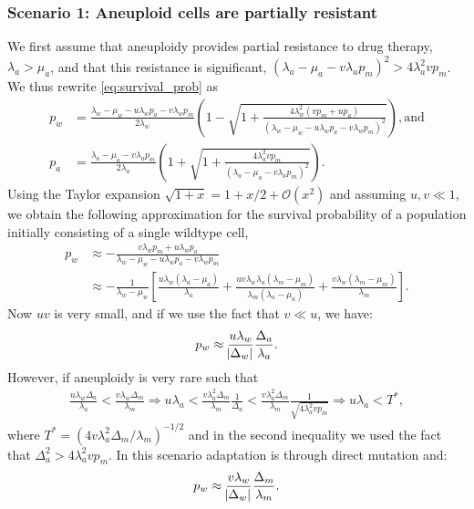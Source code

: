 \documentclass[12pt]{extarticle}
\begin{document}
\begin{appendices}
\subsubsection*{Scenario 1: Aneuploid cells are partially resistant} 

We first assume that aneuploidy provides partial resistance to drug therapy, $\lambda_a>\mu_a$, and that this resistance is significant, $\left(\lambda_a-\mu_a-v\lambda_ap_m\right)^2 > 4\lambda_a^2 v p_m$.
We thus rewrite \cref{eq:survival_prob} as
\begin{align*}
p_w&=\frac{\lambda_w-\mu_w-u\lambda_wp_a-v\lambda_wp_m}{2\lambda_w}\left(1-\sqrt{1+\frac{4\lambda_w^2\left(vp_m+up_a\right)}{\left(\lambda_w-\mu_w-u\lambda_wp_a-v\lambda_wp_m\right)^2}}\right) ,
\text{and} \\
p_a&=\frac{\lambda_a-\mu_a-v\lambda_ap_m}{2\lambda_a}\left(1+\sqrt{1+\frac{4\lambda_a^2vp_m}{\left(\lambda_a-\mu_a-v\lambda_ap_m\right)^2}}\right) . 
\end{align*}
Using the Taylor expansion $\sqrt{1+x}=1+x/2+\mathcal{O}(x^2)$ and assuming $u,v \ll 1$,
we obtain the following approximation for the survival probability of a population initially consisting of a single wildtype cell,
\begin{align} \label{eq:survprobwapprox1}
p_w 
&\approx -\frac{v\lambda_wp_m+u\lambda_wp_a}{\lambda_w-\mu_w-u\lambda_wp_a-v\lambda_wp_m}\\
\nonumber
&\approx-\frac{1}{\lambda_w-\mu_w}\left[\frac{u\lambda_w\left(\lambda_a-\mu_a\right)}{\lambda_a}+\frac{uv\lambda_w\lambda_a\left(\lambda_m-\mu_m\right)}{\lambda_m\left(\lambda_a-\mu_a\right)}+\frac{v\lambda_w\left(\lambda_m-\mu_m\right)}{\lambda_m}\right].
\end{align}
Now $u v$ is very small, and if we use the fact that $v \ll u$, we have:
\begin{equation}\label{eq:pw_parttolerant}
p_w \approx \frac{u\lambda_w}{\abs{\Delta_w}}  \frac{\Delta_a}{\lambda_a} .
\end{equation}
However, if aneuploidy is very rare such that
\begin{align*}
\frac{u\lambda_w\Delta_a}{\lambda_a}<\frac{v\lambda_w\Delta_m}{\lambda_m}\Rightarrow u\lambda_a<\frac{v\lambda_a^2\Delta_m}{\lambda_m} \frac{1}{\Delta_a}<\frac{v\lambda_a^2\Delta_m}{\lambda_m} \frac{1}{\sqrt{4\lambda_a^2 v p_m}}\Rightarrow u\lambda_a<T^*,
\end{align*}
where $T^* = (4 v \lambda_a^2 \Delta_m/\lambda_m)^{-1/2}$ and in the second inequality we used the fact that $\Delta_a^2 > 4\lambda_a^2 v p_m$. In this scenario adaptation is through direct mutation and:
\begin{equation*}
p_w \approx \frac{v\lambda_w}{\abs{\Delta_w}}  \frac{\Delta_m}{\lambda_m} .
\end{equation*}

\end{appendices}
\end{document}
